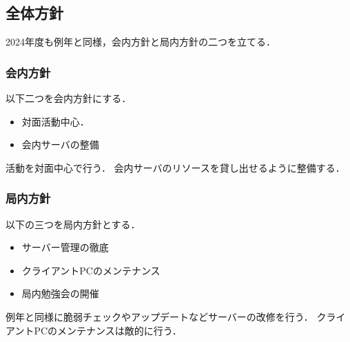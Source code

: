 \subsection*{全体方針}


2024年度も例年と同様，会内方針と局内方針の二つを立てる．

\subsubsection*{会内方針}
以下二つを会内方針にする．
\begin{itemize}
    \item 対面活動中心．
    \item 会内サーバの整備
\end{itemize}
活動を対面中心で行う．
会内サーバのリソースを貸し出せるように整備する．

\subsubsection*{局内方針}
以下の三つを局内方針とする．
\begin{itemize}
    \item サーバー管理の徹底
    \item クライアントPCのメンテナンス
    \item 局内勉強会の開催
\end{itemize}
例年と同様に脆弱チェックやアップデートなどサーバーの改修を行う．
クライアントPCのメンテナンスは敵的に行う．